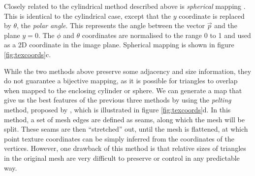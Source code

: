 Closely related to the cylindrical method described above is {\it spherical} mapping \cite{Lengyel02}. This is identical to the cylindrical case, except that the $y$ coordinate is replaced by $\theta$, the {\it polar angle}. This represents the angle between the vector $\vec{p}$ and the plane $y=0$. The $\phi$ and $\theta$ coordinates are normalised to the range 0 to 1 and used as a 2D coordinate in the image plane. Spherical mapping is shown in figure \ref{fig:texcoords}c.

While the two methods above preserve some adjacency and size information, they do not guarantee a bijective mapping, as it is possible for triangles to overlap when mapped to the enclosing cylinder or sphere. We can generate a map that give us the best features of the previous three methods by using the {\it pelting} method, proposed by \citet{Piponi00}, which is illustrated in figure \ref{fig:texcoords}d. In this method, a set of mesh edges are defined as seams, along which the mesh will be split. These seams are then ``stretched'' out, until the mesh is flattened, at which point texture coordinates can be simply inferred from the coordinates of the vertices. However, one drawback of this method is that relative sizes of triangles in the original mesh are very difficult to preserve or control in any predictable way.

